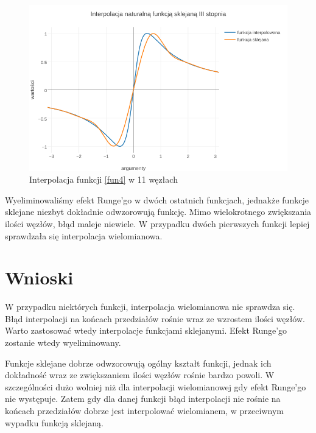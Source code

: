 \documentclass{article}
\begin{document}
\begin{figure}[ht]
	\begin{center}
		\includegraphics[width=13cm]{spline_d}
	\end{center}
	\caption{Interpolacja funkcji \eqref{fun4} w 11 węzłach}
	\label{fig:rysunek4}
\end{figure}


Wyeliminowaliśmy efekt Runge'go w dwóch ostatnich funkcjach, jednakże funkcje sklejane niezbyt dokładnie odwzorowują funkcję. Mimo wielokrotnego zwiększania ilości węzłów, błąd maleje niewiele. W przypadku dwóch pierwszych funkcji lepiej sprawdzała się interpolacja wielomianowa.
	
	
\section{Wnioski}

W przypadku niektórych funkcji, interpolacja wielomianowa nie sprawdza się. Błąd interpolacji na końcach przedziałów rośnie wraz ze wzrostem ilości węzłów. Warto zastosować wtedy interpolacje funkcjami sklejanymi. Efekt Runge'go zostanie wtedy wyeliminowany. 

Funkcje sklejane dobrze odwzorowują ogólny kształt funkcji, jednak ich dokładność wraz ze zwiększaniem ilości węzłów rośnie bardzo powoli. W szczególności dużo wolniej niż dla interpolacji wielomianowej gdy efekt Runge'go nie występuje. Zatem gdy dla danej funkcji błąd interpolacji nie rośnie na końcach przedziałów dobrze jest interpolować wielomianem, w przeciwnym wypadku funkcją sklejaną.
\end{document}
